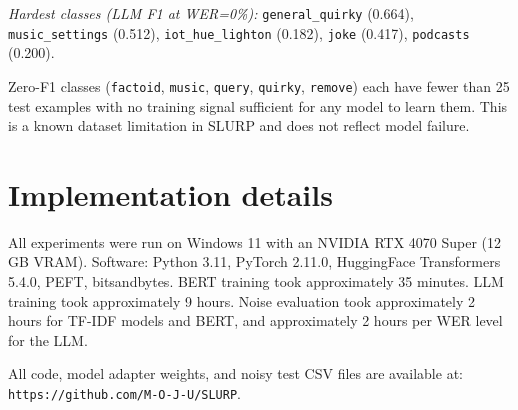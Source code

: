 \documentclass[11pt,a4paper]{article}
\begin{document}
\textit{Hardest classes (LLM F1 at WER=0\%):} \texttt{general\_quirky} (0.664), \texttt{music\_settings} (0.512), \texttt{iot\_hue\_lighton} (0.182), \texttt{joke} (0.417), \texttt{podcasts} (0.200).

Zero-F1 classes (\texttt{factoid}, \texttt{music}, \texttt{query}, \texttt{quirky}, \texttt{remove}) each have fewer than 25 test examples with no training signal sufficient for any model to learn them. This is a known dataset limitation in SLURP and does not reflect model failure.

\section{Implementation details}
\label{app:impl}

All experiments were run on Windows 11 with an NVIDIA RTX 4070 Super (12\,GB VRAM). Software: Python 3.11, PyTorch 2.11.0, HuggingFace Transformers 5.4.0, PEFT, bitsandbytes. BERT training took approximately 35 minutes. LLM training took approximately 9 hours. Noise evaluation took approximately 2 hours for TF-IDF models and BERT, and approximately 2 hours per WER level for the LLM.

All code, model adapter weights, and noisy test CSV files are available at: \\\texttt{https://github.com/M-O-J-U/SLURP}.
\end{document}
